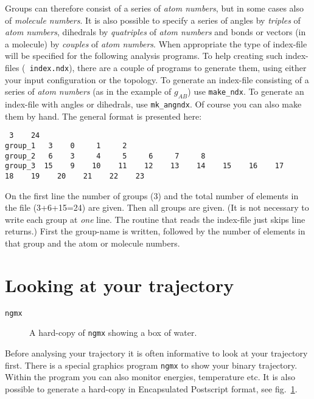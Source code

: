 Groups can therefore consist of a series of {\em atom numbers}, but in
some cases also of {\em molecule numbers}.  It is also possible to
specify a series of angles by {\em triples} of {\em atom numbers},
dihedrals by {\em quatriples} of {\em atom numbers} and bonds or
vectors (in a molecule) by {\em couples} of {\em atom numbers}. When
appropriate the type of index-file will be specified for the following
analysis programs.  To help creating such index-files ({\tt
index.ndx}), there are a couple of programs to generate them, using
either your input configuration or the topology.  To generate an
index-file consisting of a series of {\em atom numbers} (as in the
example of $g_{AB}$) use {\tt make\_ndx}. To generate an index-file
with angles or dihedrals, use {\tt mk\_angndx}. Of course you can also
make them by hand. The general format is presented here:
\begin{verbatim}
 3    24
group_1   3    0     1     2
group_2   6    3     4     5     6     7     8
group_3  15    9    10    11    12    13    14    15    16    17    
18    19    20    21    22    23
\end{verbatim}
On the first line the number of groups (3) and the total number of elements 
in the file (3+6+15=24) are given. Then all groups are given. 
(It is not necessary to write each group at {\em one} line. The routine that 
reads the index-file just skips line returns.) First the group-name is 
written, followed by the number of elements in that group and the atom or 
molecule numbers.
%
%
\section{Looking at your trajectory}
\label{sec:lookwhostalking}
\begin{verbatim}
ngmx
\end{verbatim}
%
\begin{figure}
\centerline{
{}}
\caption{A hard-copy of {\tt ngmx} showing a box of water.}
\label{fig:ngmxdump}
\end{figure}
%
Before analysing your trajectory it is often informative to look at your 
trajectory first. There is a special graphics program {\tt ngmx} to show your 
binary trajectory. Within the program you can also monitor energies, 
temperature etc. It is also possible to generate a hard-copy in Encapsulated 
Postscript format, see fig.~\ref{fig:ngmxdump}.
%
%
